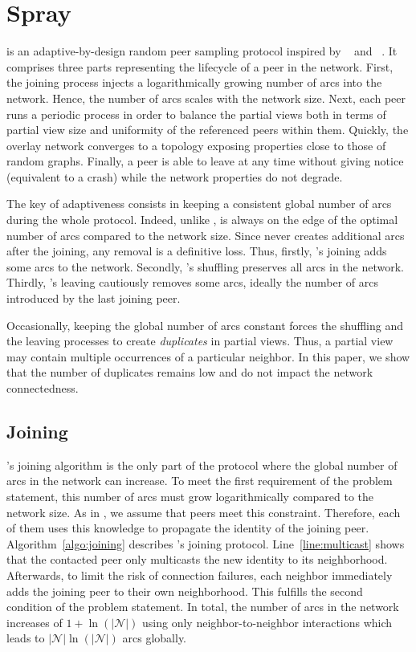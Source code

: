 
\section{Spray}
\label{sec:proposal}

\SPRAY is an adaptive-by-design random peer sampling protocol inspired by
\SCAMP~\cite{ganesh2003peer} and \CYCLON~\cite{voulgaris2005cyclon}. It
comprises three parts representing the lifecycle of a peer in the network.
First, the joining process injects a logarithmically growing number of arcs
into the network. Hence, the number of arcs scales with the network size.  Next,
each peer runs a periodic process in order to balance the partial views both in
terms of partial view size and uniformity of the referenced peers within
them. Quickly, the overlay network converges to a topology exposing properties
close to those of random graphs. Finally, a peer is able to leave at any time 
without giving notice (equivalent to a crash) while the network properties do
not degrade.

The key of adaptiveness consists in keeping a consistent global number of arcs
during the whole protocol. Indeed, unlike \CYCLON, \SPRAY is always on the edge
of the optimal number of arcs compared to the network size. Since \SPRAY never
creates additional arcs after the joining, any removal is a definitive
loss. Thus, firstly, \SPRAY's joining adds some arcs to the network. Secondly,
\SPRAY's shuffling preserves all arcs in the network. Thirdly, \SPRAY's leaving
cautiously removes some arcs, ideally the number of arcs introduced by the last
joining peer.

Occasionally, keeping the global number of arcs constant forces the shuffling
and the leaving processes to create \emph{duplicates} in partial views. Thus,
a partial view may contain multiple occurrences of a particular neighbor. In this
paper, we show that the number of duplicates remains low and do not impact the
network connectedness.

\subsection{Joining}

\SPRAY's joining algorithm is the only part of the protocol where the global
number of arcs in the network can increase. To meet the first requirement of the
problem statement, this number of arcs must grow logarithmically compared to the
network size. As in \SCAMP, we assume that peers meet this
constraint. Therefore, each of them uses this knowledge to propagate the
identity of the joining peer. Algorithm~\ref{algo:joining} describes \SPRAY's
joining protocol. Line~\ref{line:multicast} shows that the contacted peer only
multicasts the new identity to its neighborhood. Afterwards, to limit the risk
of connection failures, each neighbor immediately adds the joining peer to their
own neighborhood. This fulfills the second condition of the problem statement.
In total, the number of arcs in the network increases of $1+\ln(|\mathcal{N}|)$
using only neighbor-to-neighbor interactions which leads to
$|\mathcal{N}|\ln(|\mathcal{N}|)$ arcs globally.

